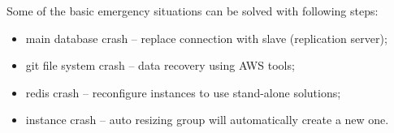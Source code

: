 	Some of the basic emergency situations can be solved with following steps:
	\begin{itemize}
		\item
		{
			main database crash -- replace connection with slave (replication server);
		}
		\item
		{
			\gls{git} file system crash -- data recovery using \gls{AWS} tools;
		}
		\item
		{
			\gls{redis} crash -- reconfigure instances to use stand-alone solutions;
		}
		\item
		{
			instance crash -- auto resizing group will automatically create a new one.
		}
	\end{itemize}